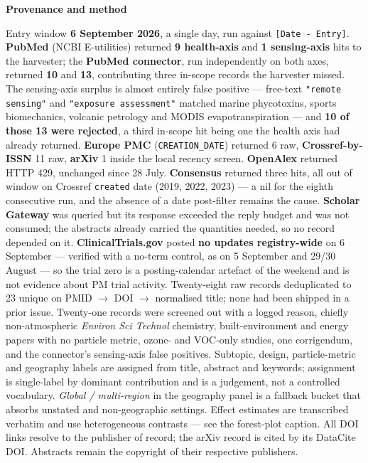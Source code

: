 \documentclass[10pt]{article}
\begin{document}
\vspace{4mm}
\begin{keybox}
{\sffamily\bfseries\footnotesize\color{Deep}Provenance and method}\\[1.2mm]
{\fontsize{7.2}{8.8}\selectfont
Entry window \textbf{6 September 2026}, a single day, run against \texttt{[Date - Entry]}.
\textbf{PubMed} (NCBI E-utilities) returned \textbf{9 health-axis} and \textbf{1
sensing-axis} hits to the harvester; the \textbf{PubMed connector}, run independently on
both axes, returned \textbf{10} and \textbf{13}, contributing three in-scope records the
harvester missed. The sensing-axis surplus is almost entirely false positive --- free-text
\texttt{"remote sensing"} and \texttt{"exposure assessment"} matched marine phycotoxins,
sports biomechanics, volcanic petrology and MODIS evapotranspiration --- and \textbf{10 of
those 13 were rejected}, a third in-scope hit being one the health axis had already
returned. \textbf{Europe PMC} (\texttt{CREATION\_DATE}) returned 6 raw,
\textbf{Crossref-by-ISSN} 11 raw, \textbf{arXiv} 1 inside the local recency screen.
\textbf{OpenAlex} returned HTTP 429, unchanged since 28 July. \textbf{Consensus} returned
three hits, all out of window on Crossref \texttt{created} date (2019, 2022, 2023) --- a nil
for the eighth consecutive run, and the absence of a date post-filter remains the cause.
\textbf{Scholar Gateway} was queried but its response exceeded the reply budget and was not
consumed; the abstracts already carried the quantities needed, so no record depended on it.
\textbf{ClinicalTrials.gov} posted \textbf{no updates registry-wide} on 6 September ---
verified with a no-term control, as on 5 September and 29/30 August --- so the trial zero is
a posting-calendar artefact of the weekend and is not evidence about PM trial activity.
Twenty-eight raw records deduplicated to 23 unique on PMID $\to$ DOI $\to$ normalised title;
none had been shipped in a prior issue. Twenty-one records were screened out with a logged
reason, chiefly non-atmospheric \textit{Environ Sci Technol} chemistry, built-environment
and energy papers with no particle metric, ozone- and VOC-only studies, one corrigendum,
and the connector's sensing-axis false positives.
Subtopic, design, particle-metric and geography labels are assigned from title, abstract
and keywords; assignment is single-label by dominant contribution and is a judgement, not a
controlled vocabulary. \textit{Global / multi-region} in the geography panel is a fallback
bucket that absorbs unstated and non-geographic settings. Effect estimates are transcribed
verbatim and use heterogeneous contrasts --- see the forest-plot caption.
All DOI links resolve to the publisher of record; the arXiv record is cited by its DataCite
DOI. Abstracts remain the copyright of their respective publishers.\par}
\end{keybox}
\end{document}
